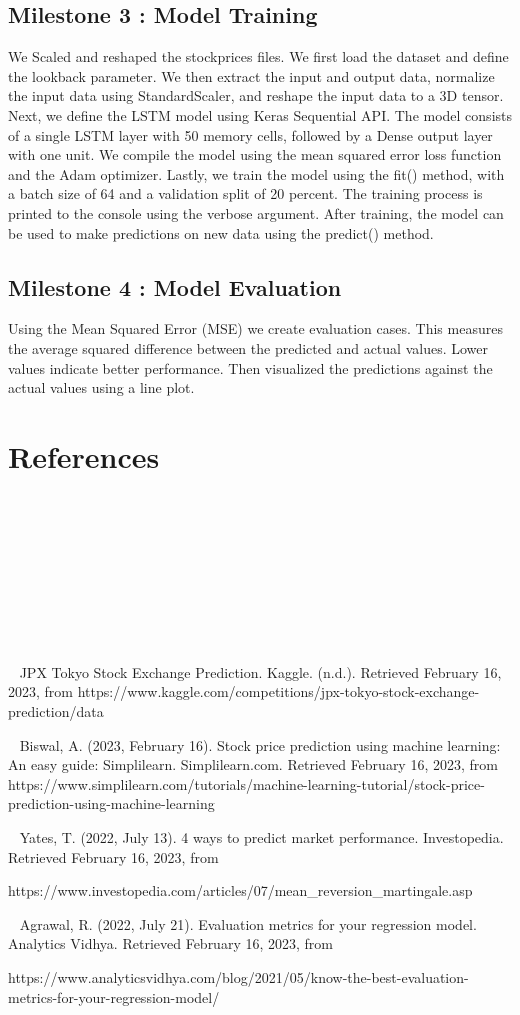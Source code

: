 \documentclass{article}
\begin{document}
\subsection{Milestone 3 : Model Training }
We Scaled and reshaped the stockprices files.
We first load the dataset and define the lookback parameter. We then extract the input and output data, normalize the input data using StandardScaler, and reshape the input data to a 3D tensor. 
Next, we define the LSTM model using Keras Sequential API. The model consists of a single LSTM layer with 50 memory cells, followed by a Dense output layer with one unit. We compile the model using the mean squared error loss function and the Adam optimizer.
Lastly, we train the model using the fit() method, with a batch size of 64 and a validation split of 20 percent. The training process is printed to the console using the verbose argument. After training, the model can be used to make predictions on new data using the predict() method.

\subsection{Milestone 4 : Model Evaluation }
Using the Mean Squared Error (MSE) we create evaluation cases. This measures the average squared difference between the predicted and actual values. Lower values indicate better performance.
Then visualized the predictions against the actual values using a line plot. 


\section{References}

~\cite{hegazy2014machine}

~\cite{CHONG2017187}

~\cite{JIANG2021115537}

~\cite{8541310}

~\cite{arXiv:1605.00003}

~\cite{JPX} 
JPX Tokyo Stock Exchange Prediction. Kaggle. (n.d.). Retrieved February 16, 2023, from https://www.kaggle.com/competitions/jpx-tokyo-stock-exchange-prediction/data 

~\cite{Biswal} 
Biswal, A. (2023, February 16). Stock price prediction using machine learning: An easy guide: Simplilearn. Simplilearn.com. Retrieved February 16, 2023, from https://www.simplilearn.com/tutorials/machine-learning-tutorial/stock-price-prediction-using-machine-learning 

~\cite{Yates} 
Yates, T. (2022, July 13). 4 ways to predict market performance. Investopedia. Retrieved February 16, 2023, from 

https://www.investopedia.com/articles/07/mean_reversion_martingale.asp 

~\cite{Agrawal} 
Agrawal, R. (2022, July 21). Evaluation metrics for your regression model. Analytics Vidhya. Retrieved February 16, 2023, from 

https://www.analyticsvidhya.com/blog/2021/05/know-the-best-evaluation-metrics-for-your-regression-model/ 
\end{document}
